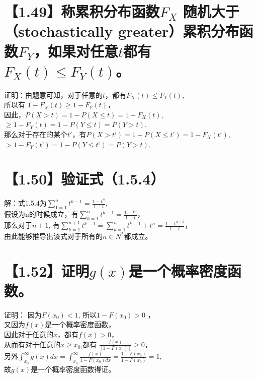 \documentclass [12pt]{article}
\newcommand{\sumn}[1]{\sum\limits_{#1=1}^n}
\begin{document}
\begin{CJK*}{GBK}{kai}
\section{【1.49】称累积分布函数$F_{X}$ \textbf{随机大于}（stochastically greater）累积分布函数$F_{Y}$，如果对任意$t$都有$F_{X}(t) \leqslant F_{Y}(t)$。}
证明：由题意可知，对于任意的$t$，都有$F_{X}(t) \le F_{Y}(t)$,\\
所以有 $1-F_{X}(t) \ge 1-F_{Y}(t)$，\\
因此，$P(X>t)=1-P(X \le t)=1-F_{X}(t) $,\\
$ \ge 1-F_{Y}(t) = 1-P(Y \le t)=P(Y>t)$.\\
那么对于存在的某个$t'$，有$P(X>t‘)=1-P(X \le t’)=1-F_{X}(t‘) $,\\
$ > 1-F_{Y}(t’) = 1-P(Y \le t‘)=P(Y>t)$.\\


\section{【1.50】验证式（1.5.4）}
解：式1.5.4为$\sumn 1 t^{k-1}=\frac{1-t^n}{1-t}$, \\
假设为n的时候成立，有$\sumn k t^{k-1}=\frac{1-t^n}{1-t}$，\\
那么对于$n+1$, 有$\sum\limits_{k=1}^{n+1} t^{k-1}=\sumn k t^{k-1} + t^n=\frac{1-t^{n+1}}{1-t}$， \\
由此能够推导出该式对于所有的$n \in N^*$都成立。 


\section{【1.52】证明$g(x)$是一个概率密度函数。}
证明： 因为$F(x_0)<1$, 所以$1-F(x_0) >0$ ，\\
又因为$f(x)$是一个概率密度函数，\\
因此对于任意的$x$，都有$f(x)>0$，\\
从而有对于任意的$x \ge x_0$,都有 $\frac{f(x)}{[1-F(x_0) ]} \ge 0$，\\
另外$\int_{x_0}^{\infty}g(x)dx=\int_{x_0}^{\infty}\frac{f(x)}{1-F(x_0)dx}=\frac{1-F(x_0)}{1-F(x_0)}=1$,\\
故$g(x)$是一个概率密度函数得证。


\end{CJK*}
\end{document}
